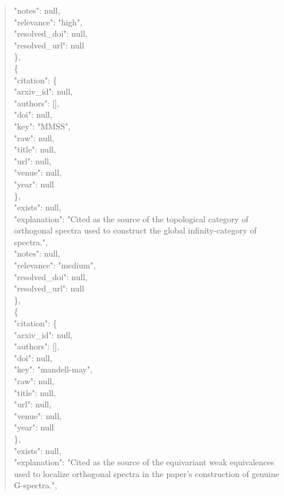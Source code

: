\documentclass[11pt]{article}
\begin{document}
\begin{quote}
      "notes": null,\\
      "relevance": "high",\\
      "resolved\_doi": null,\\
      "resolved\_url": null\\
    \},\\
    \{\\
      "citation": \{\\
        "arxiv\_id": null,\\
        "authors": [],\\
        "doi": null,\\
        "key": "MMSS",\\
        "raw": null,\\
        "title": null,\\
        "url": null,\\
        "venue": null,\\
        "year": null\\
      \},\\
      "exists": null,\\
      "explanation": "Cited as the source of the topological category of orthogonal spectra used to construct the global infinity-category of spectra.",\\
      "notes": null,\\
      "relevance": "medium",\\
      "resolved\_doi": null,\\
      "resolved\_url": null\\
    \},\\
    \{\\
      "citation": \{\\
        "arxiv\_id": null,\\
        "authors": [],\\
        "doi": null,\\
        "key": "mandell-may",\\
        "raw": null,\\
        "title": null,\\
        "url": null,\\
        "venue": null,\\
        "year": null\\
      \},\\
      "exists": null,\\
      "explanation": "Cited as the source of the equivariant weak equivalences used to localize orthogonal spectra in the paper's construction of genuine G-spectra.",\\

\end{quote}
\end{document}
